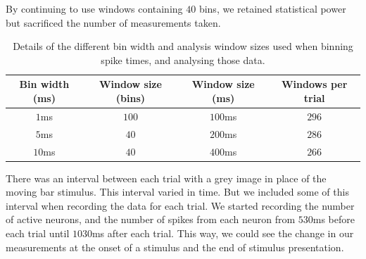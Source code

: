    By continuing to use windows containing $40$ bins, we retained statistical power but sacrificed the number of measurements taken.

    \begin{table}
      \centering
      \begin{tabular}[h]{|c|c|c|c|}
        \hline
        \textbf{Bin width (ms)}   & \textbf{Window size (bins)}   & \textbf{Window size (ms)} & \textbf{Windows per trial}  \\ \hline
        $1$ms                     & $100$                         & $100$ms                   & $296$                       \\ \hline
        $5$ms                     & $40$                          & $200$ms                   & $286$                       \\ \hline
        $10$ms                    & $40$                          & $400$ms                   & $266$                       \\ \hline
      \end{tabular}
      \caption{Details of the different bin width and analysis window sizes used when binning spike times, and analysing those data.}
      \label{tab:bin_widths}
    \end{table}

    There was an interval between each trial with a grey image in place of the moving bar stimulus. This interval varied in time. But we included some of this interval when recording the data for each trial. We started recording the number of active neurons, and the number of spikes from each neuron from $530$ms before each trial until $1030$ms after each trial. This way, we could see the change in our measurements at the onset of a stimulus and the end of stimulus presentation.

